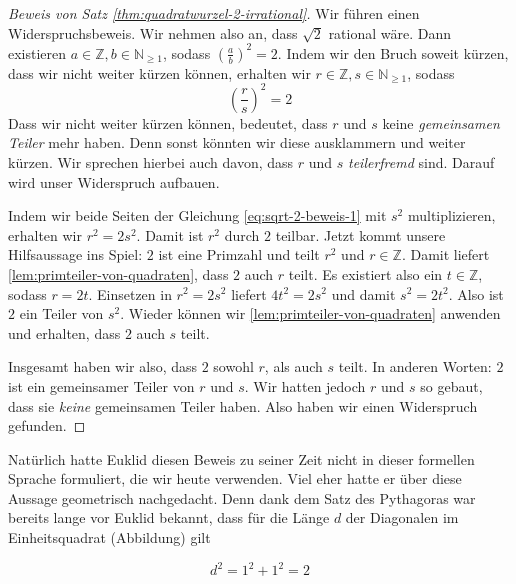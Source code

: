 \begin{proof}[Beweis von Satz \ref{thm:quadratwurzel-2-irrational}]
    Wir führen einen Widerspruchsbeweis. Wir nehmen also an, dass \(\sqrt{2}\) rational wäre. Dann existieren \(a \in \mathbb Z, b \in \mathbb N_{\geq 1}\), sodass \(\left(\frac{a}{b}\right)^2 = 2\). Indem wir den Bruch soweit kürzen, dass wir nicht weiter kürzen können, erhalten wir \(r \in \mathbb Z, s \in \mathbb N_{\geq 1}\), sodass 
    \begin{equation}\label{eq:sqrt-2-beweis-1}
        \left(\frac{r}{s}\right)^2 = 2
    \end{equation}
    Dass wir nicht weiter kürzen können, bedeutet, dass \(r\) und \(s\) keine \textit{gemeinsamen Teiler} mehr haben. Denn sonst könnten wir diese ausklammern und weiter kürzen. Wir sprechen hierbei auch davon, dass \(r\) und \(s\) \textit{teilerfremd} sind. Darauf wird unser Widerspruch aufbauen. 

    Indem wir beide Seiten der Gleichung \eqref{eq:sqrt-2-beweis-1} mit \(s^2\) multiplizieren, erhalten wir \(r^2 = 2s^2\). Damit ist \(r^2\) durch \(2\) teilbar. Jetzt kommt unsere Hilfsaussage ins Spiel: \(2\) ist eine Primzahl und teilt \(r^2\) und \(r \in \mathbb Z\). Damit liefert \cref{lem:primteiler-von-quadraten}, dass \(2\) auch \(r\) teilt. Es existiert also ein \(t \in \mathbb Z\), sodass \(r = 2t\). Einsetzen in \(r^2 = 2s^2\) liefert \(4t^2 = 2s^2\) und damit \(s^2 = 2t^2\). Also ist \(2\) ein Teiler von \(s^2\). Wieder können wir \cref{lem:primteiler-von-quadraten} anwenden und erhalten, dass \(2\) auch \(s\) teilt. 

    Insgesamt haben wir also, dass \(2\) sowohl \(r\), als auch \(s\) teilt. In anderen Worten: \(2\) ist ein gemeinsamer Teiler von \(r\) und \(s\). Wir hatten jedoch \(r\) und \(s\) so gebaut, dass sie \textit{keine} gemeinsamen Teiler haben. Also haben wir einen Widerspruch gefunden. 
\end{proof}

Natürlich hatte Euklid diesen Beweis zu seiner Zeit nicht in dieser formellen Sprache formuliert, die wir heute verwenden. Viel eher hatte er über diese Aussage geometrisch nachgedacht. Denn dank dem Satz des Pythagoras war bereits lange vor Euklid bekannt, dass für die Länge \(d\) der Diagonalen im Einheitsquadrat (Abbildung) gilt 

\begin{equation*}
    d^2 = 1^2 + 1^2 = 2 
\end{equation*}

